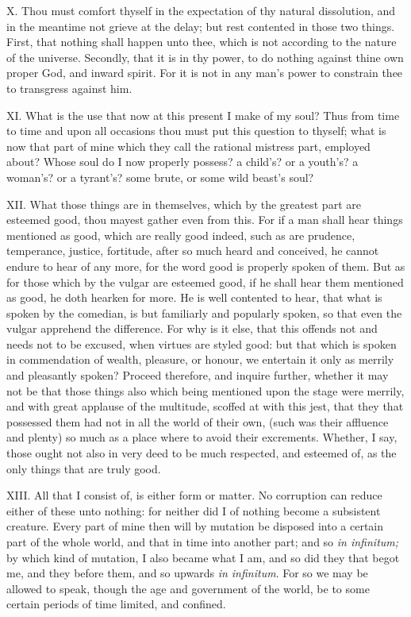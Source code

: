 X. Thou must comfort thyself in the expectation of thy natural
dissolution, and in the meantime not grieve at the delay; but rest
contented in those two things. First, that nothing shall happen unto thee,
which is not according to the nature of the universe. Secondly, that it is
in thy power, to do nothing against thine own proper God, and inward
spirit. For it is not in any man's power to constrain thee to transgress
against him.

XI. What is the use that now at this present I make of my soul? Thus
from time to time and upon all occasions thou must put this question to
thyself; what is now that part of mine which they call the rational
mistress part, employed about? Whose soul do I now properly possess? a
child's? or a youth's? a woman's? or a tyrant's? some brute, or some wild
beast's soul?

XII. What those things are in themselves, which by the greatest part are
esteemed good, thou mayest gather even from this. For if a man shall hear
things mentioned as good, which are really good indeed, such as are
prudence, temperance, justice, fortitude, after so much heard and
conceived, he cannot endure to hear of any more, for the word good is
properly spoken of them. But as for those which by the vulgar are esteemed
good, if he shall hear them mentioned as good, he doth hearken for more.
He is well contented to hear, that what is spoken by the comedian, is but
familiarly and popularly spoken, so that even the vulgar apprehend the
difference. For why is it else, that this offends not and needs not to be
excused, when virtues are styled good: but that which is spoken in
commendation of wealth, pleasure, or honour, we entertain it only as
merrily and pleasantly spoken? Proceed therefore, and inquire further,
whether it may not be that those things also which being mentioned upon
the stage were merrily, and with great applause of the multitude, scoffed
at with this jest, that they that possessed them had not in all the world
of their own, (such was their affluence and plenty) so much as a place
where to avoid their excrements. Whether, I say, those ought not also in
very deed to be much respected, and esteemed of, as the only things that
are truly good.

XIII. All that I consist of, is either form or matter. No corruption can
reduce either of these unto nothing: for neither did I of nothing become
a subsistent creature. Every part of mine then will by mutation be
disposed into a certain part of the whole world, and that in time into
another part; and so \emph{in infinitum;} by which kind of mutation, I
also became what I am, and so did they that begot me, and they before
them, and so upwards \emph{in infinitum}. For so we may be allowed to
speak, though the age and government of the world, be to some certain
periods of time limited, and confined.

